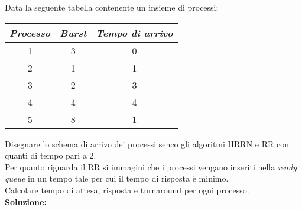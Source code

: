 \documentclass{article}
\begin{document}
    Data la seguente tabella contenente un insieme di processi:
    \begin{center}
        \begin{tabular}{|c|c|c|}
            \hline
            \emph{Processo} & \emph{Burst} & \emph{Tempo di arrivo}\\
            \hline
            1 & 3 & 0\\
            \hline
            2 & 1 & 1\\
            \hline
            3 & 2 & 3\\
            \hline
            4 & 4 & 4\\
            \hline
            5 & 8 & 1\\
            \hline
        \end{tabular}
    \end{center}
    Disegnare lo schema di arrivo dei processi senco gli algoritmi HRRN e RR con quanti di tempo pari a 2.\\
    Per quanto riguarda il RR si immagini che i processi vengano inseriti nella \emph{ready queue} in un tempo tale per cui il tempo di risposta è minimo.\\
    Calcolare tempo di attesa, risposta e turnaround per ogni processo.\\
    \textbf{Soluzione:}
\end{document}
